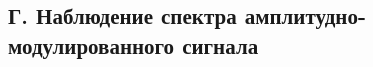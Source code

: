 \documentclass[a4paper,12pt]{article} %
\begin{document}




\subsection*{Г. Наблюдение спектра амплитудно-модулированного сигнала}
\end{document}
